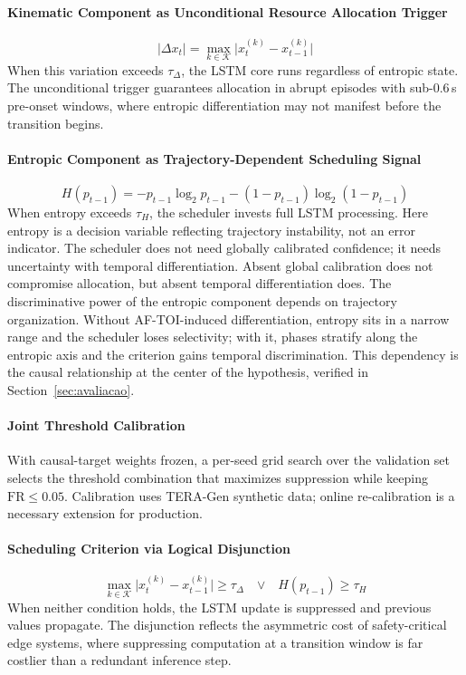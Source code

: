 \documentclass[a4paper,fleqn]{cas-dc}
\newcommand{\TERAGen}{\mbox{TERA-Gen}\xspace}
\newcommand{\AFTOI}{\mbox{AF-TOI}\xspace}
\begin{document}
\paragraph{Kinematic Component as Unconditional Resource Allocation Trigger}
\begin{equation}
  |\Delta x_t| = \max_{k \in \mathcal{K}} \bigl|x_t^{(k)} - x_{t-1}^{(k)}\bigr|
  \label{eq:delta_kin}
\end{equation}
When this variation exceeds $\tau_\Delta$, the LSTM core runs regardless of
entropic state. The unconditional trigger guarantees allocation in abrupt
episodes with sub-0.6\,s pre-onset windows, where entropic differentiation may
not manifest before the transition begins.
\paragraph{Entropic Component as Trajectory-Dependent Scheduling Signal}
\begin{equation}
H(p_{t-1}) = -p_{t-1}\log_2 p_{t-1} - (1 - p_{t-1})\log_2(1 - p_{t-1})
\label{eq:entropia}
\end{equation}
When entropy exceeds $\tau_H$, the scheduler invests full LSTM processing. Here
entropy is a decision variable reflecting trajectory instability, not an error
indicator. The scheduler does not need globally calibrated confidence; it needs
uncertainty with temporal differentiation. Absent global calibration does not
compromise allocation, but absent temporal differentiation does.
The discriminative power of the entropic component depends on trajectory
organization. Without \AFTOI-induced differentiation, entropy sits in a narrow
range and the scheduler loses selectivity; with it, phases stratify along the
entropic axis and the criterion gains temporal discrimination. This dependency
is the causal relationship at the center of the hypothesis, verified in
Section~\ref{sec:avaliacao}.
\paragraph{Joint Threshold Calibration}
With causal-target weights frozen, a per-seed grid search over the validation
set selects the threshold combination that maximizes suppression while keeping
$\mathrm{FR} \le 0.05$. Calibration uses \TERAGen synthetic data; online
re-calibration is a necessary extension for production.
\paragraph{Scheduling Criterion via Logical Disjunction}
\begin{equation}
\max_{k \in \mathcal{K}} \bigl|x_t^{(k)} - x_{t-1}^{(k)}\bigr| \ge \tau_\Delta
\quad \boldsymbol{\lor} \quad H(p_{t-1}) \ge \tau_H
\label{eq:gating}
\end{equation}
When neither condition holds, the LSTM update is suppressed and previous values
propagate. The disjunction reflects the asymmetric cost of safety-critical edge
systems, where suppressing computation at a transition window is far costlier
than a redundant inference step.
\end{document}
